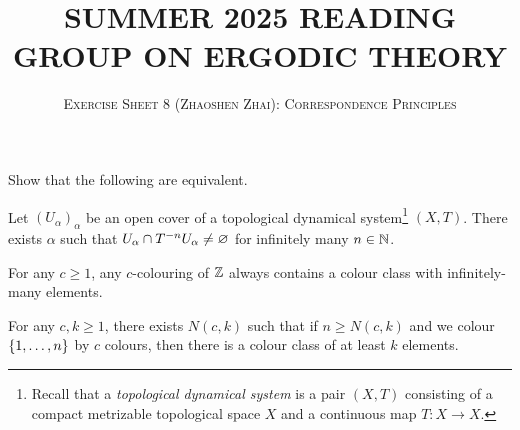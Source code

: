 \documentclass[reqno, twoside]{article}
\begin{document}
    \title{\textbf{\normalsize\MakeUppercase{Summer 2025 Reading Group on Ergodic Theory}}}
    \author{\normalsize\textsc{Exercise Sheet 8 (Zhaoshen Zhai): Correspondence Principles}}
    \date{}
    \maketitle

    \begin{exercise}
        Show that the following are equivalent.
        \begin{center}
            \begin{minipage}{0.95\textwidth}
                \begin{theorem*}
                    Let $(U_\alpha)_\alpha$ be an open cover of a topological dynamical system\footnote{Recall that a \textit{topological dynamical system} is a pair $(X,T)$ consisting of a compact metrizable topological space $X$ and a continuous map $T:X\to X$.} $(X,T)$. There exists $\alpha$ such that $U_\alpha\cap T^{-n}U_\alpha\neq\varnothing$ for infinitely many $n\in\mathbb{N}$.
                \end{theorem*}
                \begin{theorem*}
                    For any $c\geq1$, any $c$-colouring of $\mathbb{Z}$ always contains a colour class with infinitely-many elements.
                \end{theorem*}
                \begin{theorem*}
                    For any $c,k\geq1$, there exists $N(c,k)$ such that if $n\geq N(c,k)$ and we colour $\left\{1,\dots,n\right\}$ by $c$ colours, then there is a colour class of at least $k$ elements.
                \end{theorem*}
            \end{minipage}
        \end{center}
    \end{exercise}
\end{document}
